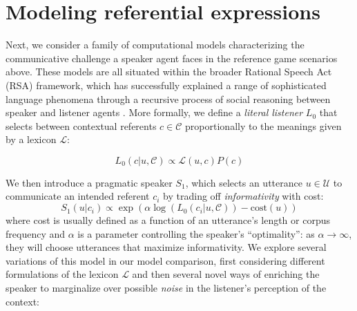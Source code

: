 \documentclass[10pt,letterpaper]{article}
\begin{document}
\section{\bf Modeling referential expressions}

Next, we consider a family of computational models characterizing the communicative challenge a speaker agent faces in the reference game scenarios above. These models are all situated within the broader Rational Speech Act (RSA) framework, which has successfully explained a range of sophisticated language phenomena through a recursive process of social reasoning between speaker and listener agents \cite{frank2012, goodmanstuhlmueller2013, GoodmanFrank2016}. More formally, we define a \emph{literal listener} $L_0$ that selects between contextual referents $c \in \mathcal{C}$ proportionally to the meanings given by a lexicon $\mathcal{L}$:

$$L_0(c | u, \mathcal{C}) \propto \mathcal{L}(u, c) P(c)$$

We then introduce a pragmatic speaker $S_1$, which selects an utterance $u \in \mathcal{U}$ to communicate an intended referent $c_i$ by trading off \emph{informativity} with cost:
$$S_1(u | c_i) \propto \exp\left( \alpha\log(L_0(c_i | u, \mathcal{C})) - \textrm{cost}(u) \right)$$
where cost is usually defined as a function of an utterance's length or corpus frequency and $\alpha$ is a parameter controlling the speaker's ``optimality'': as $\alpha\rightarrow \infty$, they will choose utterances that maximize informativity. We explore several variations of this model in our model comparison, first considering different formulations of the lexicon $\mathcal{L}$ and then  several novel ways of enriching the speaker to marginalize over possible \emph{noise} in the listener's perception of the context:
\end{document}
